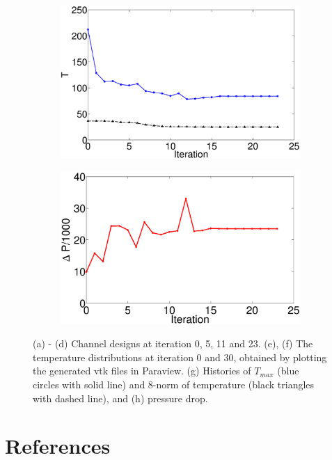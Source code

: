 \documentclass[11pt,letterpaper]{article}
\begin{document}
\begin{figure}[!h]
\begin{subfigure}{0.41\textwidth}
\includegraphics[width=\linewidth]{parallel2x2_history.eps}
\caption{}
\end{subfigure}
\begin{subfigure}{0.42\textwidth}
\includegraphics[width=\linewidth]{parallel2x2_pressure_history.eps}
\caption{}
\end{subfigure}
\caption{(a) - (d) Channel designs at iteration 0, 5, 11 and 23. (e), (f) The temperature distributions at iteration 0 and 30, obtained by plotting the generated vtk files in Paraview. (g) Histories of $T_{max}$ (blue circles with solid line) and 8-norm of temperature (black triangles with dashed line), and (h) pressure drop. }
\end{figure}


\FloatBarrier

\section{References}

    
\end{document}
